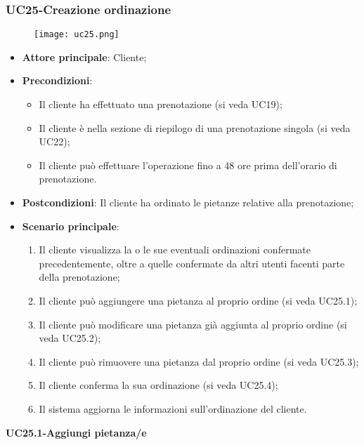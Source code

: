 \nonstopmode
\pagebreak
\subsubsection{UC25-Creazione ordinazione}
\begin{figure}[h] \texttt{[image: uc25.png]} \end{figure}

\begin{itemize}
\item \textbf{Attore principale}: Cliente;
\item \textbf{Precondizioni}:
\begin{itemize}
\item Il cliente ha effettuato una prenotazione (si veda UC19);
\item Il cliente è nella sezione di riepilogo di una prenotazione singola (si veda UC22);
\item Il cliente può effettuare l'operazione fino a 48 ore prima dell'orario di prenotazione.
\end{itemize}
\item \textbf{Postcondizioni}: Il cliente ha ordinato le pietanze relative alla prenotazione;
\item \textbf{Scenario principale}:
\begin{enumerate}
\item Il cliente visualizza la o le sue eventuali ordinazioni confermate precedentemente, oltre a quelle confermate da altri utenti facenti parte della prenotazione;
\item Il cliente può aggiungere una pietanza al proprio ordine (si veda UC25.1);
\item Il cliente può modificare una pietanza già aggiunta al proprio ordine (si veda UC25.2);
\item Il cliente può rimuovere una pietanza dal proprio ordine (si veda UC25.3);
\item Il cliente conferma la sua ordinazione (si veda UC25.4);
\item Il sistema aggiorna le informazioni sull'ordinazione del cliente.
\end{enumerate}
\end{itemize}

\pagebreak
\textbf{UC25.1-Aggiungi pietanza/e}

